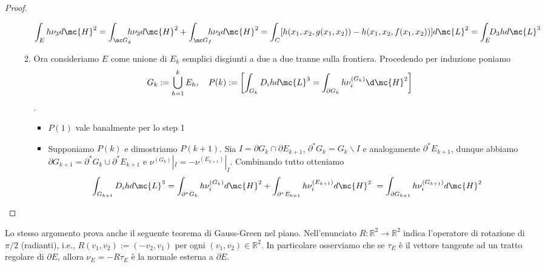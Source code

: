 \begin{proof}
\begin{itemize}
\begin{enumerate}
        \[\int_E h \nu_3 d\mc{H}^2 = \int_{ \mc G_g} \!\!\!\!h \nu_3 d\mc{H}^2 + \int_{\mc G_f} \!\!\!\!h \nu_3 d\mc{H}^2 = \int_C [h(x_1,x_2,g(x_1,x_2))-h(x_1,x_2,f(x_1,x_2))]d\mc{L}^2 = \int_E\!\! D_3 h d\mc{L}^3\]
        \item Ora consideriamo $E$ come unione di ${E_k}$ semplici disgiunti a due a due tranne sulla frontiera. Procedendo per induzione poniamo \[G_k := \bigcup_{h=1}^k E_h, \quad P(k) := \left[\int_{G_k}D_ihd\mc{L}^3 = \int_{\partial G_k} h\nu_i^{(G_k)} \d \mc{H}^2 \right]\]. \begin{itemize}
            \item $P(1)$ vale banalmente per lo step 1
            \item Supponiamo $P(k)$ e dimostriamo $P(k+1)$. Sia $I = \partial G_k \cap \partial E_{k+1}$, $\partial^* G_k = G_k\backslash I$ e analogamente $\partial^* E_{k+1}$, dunque abbiamo $\partial G_{k+1} = \partial^* G_k \cup \partial ^* E_{k+1}$ e $\nu^{(G_k)}|_I = - \nu^{(E_{k+1})}|_I$. Combinando tutto otteniamo \[\int_{G_{k+1}} D_ih d\mc{L}^3 = \int_{\partial ^* G_{k}}h\nu_i^{(G_{k})} d\mc{H}^2+ \int_{\partial ^* E_{k+1}}h\nu_i^{(E_{k+1})} d\mc{H}^2\ = \int_{\partial G_{k+1} }h \nu_i^{(G_{k+1})} d\mc{H}^2\]
        \end{itemize}
    \end{enumerate}
\end{itemize}
\end{proof}

    Lo stesso argomento prova anche il seguente teorema di Gauss-Green nel piano. Nell'enunciato $R: \mathbb{R}^{2} \rightarrow \mathbb{R}^{2}$ indica l'operatore di rotazione di $\pi / 2$ (radianti), i.e., $R\left(v_{1}, v_{2}\right):=\left(-v_{2}, v_{1}\right)$ per ogni $\left(v_{1}, v_{2}\right) \in \mathbb{R}^{2}$. In particolare osserviamo che se $\tau_E$ è il vettore tangente ad un tratto regolare di $\partial E$, allora $\nu_E = -R\tau_E$ è la normale esterna a $\partial E$.

